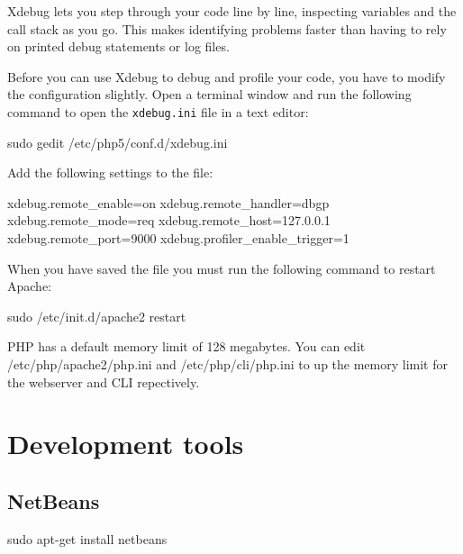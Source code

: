 \documentclass[final,ebook,10pt,twoside,openright]{memoir}
\begin{document}
Xdebug lets you step through your code line by line, inspecting variables and the call stack as you go. This makes identifying problems faster than having to rely on printed debug statements or log files.

Before you can use Xdebug to debug and profile your code, you have to modify the configuration slightly. Open a terminal window and run the following command to open the \verb!xdebug.ini! file in a text editor:

\begin{squashboxcommand}
sudo gedit /etc/php5/conf.d/xdebug.ini
\end{squashboxcommand}

Add the following settings to the file:

\begin{squashboxoutput}
xdebug.remote_enable=on
xdebug.remote_handler=dbgp
xdebug.remote_mode=req
xdebug.remote_host=127.0.0.1
xdebug.remote_port=9000
xdebug.profiler_enable_trigger=1
\end{squashboxoutput}


When you have saved the file you must run the following command to restart Apache:

\begin{squashboxcommand}
sudo /etc/init.d/apache2 restart
\end{squashboxcommand}

PHP has a default memory limit of 128 megabytes. You can edit /etc/php/apache2/php.ini and /etc/php/cli/php.ini to up the memory limit for the webserver and CLI repectively.


\chapter{Development tools} %
\label{cha:Development tools}

\section{NetBeans}
\label{sec:NetBeans}

\begin{squashboxcommand}
sudo apt-get install netbeans
\end{squashboxcommand}
\end{document}

